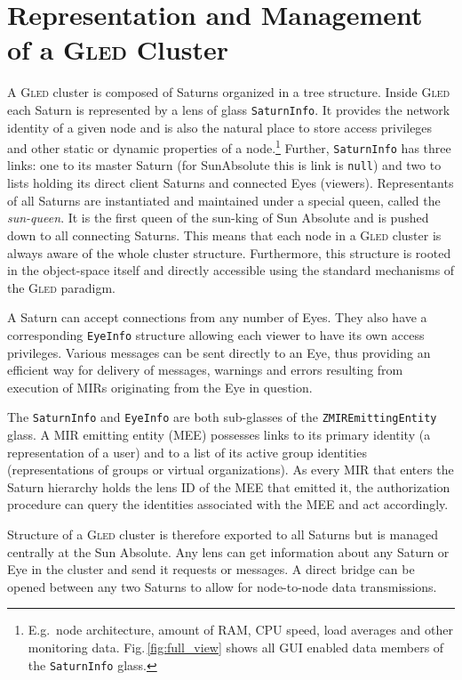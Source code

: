 \documentclass[a4paper,11pt]{article}
\def\gled{\textsc{Gled}\xspace}
\def\smalltt#1{{\small\texttt{#1}}}
\begin{document}
\section{Representation and Management of a \gled Cluster}

A \gled cluster is composed of Saturns organized in a tree structure.
Inside \gled each Saturn is represented by a lens of glass
\smalltt{SaturnInfo}. It provides the network identity of a given node
and is also the natural place to store access privileges and other
static or dynamic properties of a node.\footnote{E.g.\ node
  architecture, amount of RAM, CPU speed, load averages and other
  monitoring data.  Fig.\,\ref{fig:full_view} shows all GUI enabled data
  members of the \smalltt{SaturnInfo} glass.}  Further,
\smalltt{SaturnInfo} has three links: one to its master Saturn (for
SunAbsolute this is link is \smalltt{null}) and two to lists holding
its direct client Saturns and connected Eyes (viewers). Representants
of all Saturns are instantiated and maintained under a special queen,
called the \emph{sun-queen}. It is the first queen of the sun-king of
Sun Absolute and is pushed down to all connecting Saturns. This means
that each node in a \gled cluster is always aware of the whole cluster
structure. Furthermore, this structure is rooted in the object-space
itself and directly accessible using the standard mechanisms of the
\gled paradigm.

A Saturn can accept connections from any number of Eyes. They also
have a corresponding \smalltt{EyeInfo} structure allowing each viewer
to have its own access privileges. Various messages can be sent
directly to an Eye, thus providing an efficient way for delivery of
messages, warnings and errors resulting from execution of MIRs
originating from the Eye in question.

The \smalltt{SaturnInfo} and \smalltt{EyeInfo} are both sub-glasses of
the \smalltt{ZMIREmittingEntity} glass. A MIR emitting entity (MEE)
possesses links to its primary identity (a representation of a user)
and to a list of its active group identities (representations of
groups or virtual organizations). As every MIR that enters the Saturn
hierarchy holds the lens ID of the MEE that emitted it, the
authorization procedure can query the identities associated with the
MEE and act accordingly.

Structure of a \gled cluster is therefore exported to all Saturns but
is managed centrally at the Sun Absolute. Any lens can get information
about any Saturn or Eye in the cluster and send it requests or
messages. A direct bridge can be opened between any two Saturns to
allow for node-to-node data transmissions.
\end{document}
